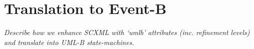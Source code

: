 

\section{Translation to Event-B}

\emph{Describe how we enhance SCXML with `umlb' attributes (inc. refinement levels) and translate into UML-B state-machines.}